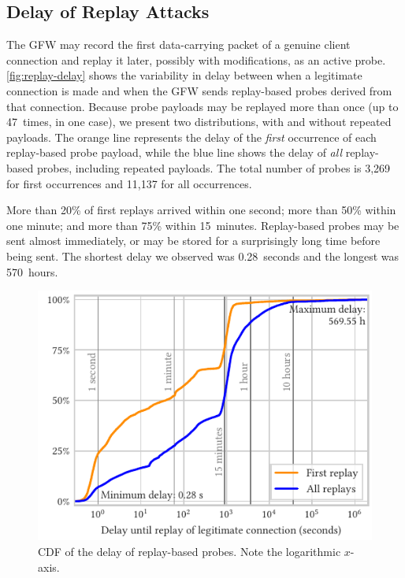 \documentclass[sigconf,letterpaper]{acmart}
\begin{document}

\subsection{Delay of Replay Attacks}
\label{sec:delay-of-replay}

The GFW may record the first data-carrying packet of a genuine client connection
and replay it later, possibly with modifications, as an active probe.
\autoref{fig:replay-delay} shows the variability in delay between
when a legitimate connection is made and when the GFW sends replay-based probes derived from that connection.
Because probe payloads may be replayed more than once
(up to 47~times, in one case),
we present two distributions,
with and without repeated payloads.
The orange line represents the delay of the \emph{first} occurrence
of each replay-based probe payload,
while the blue line shows the delay of \emph{all} replay-based probes,
including repeated payloads.
The total number of probes is 3,269 for first occurrences and 11,137 for all occurrences.

More than 20\% of first replays arrived within one second;
more than 50\% within one minute;
and more than 75\% within 15~minutes.
Replay-based probes may be sent almost immediately, or
may be stored for a surprisingly long time before being sent.
The shortest delay we observed was 0.28~seconds
and the longest was 570~hours.

\begin{figure}
    \includegraphics{figures/delay_of_replays_in_all_experiments.pdf}
    \caption{
    CDF of the delay of replay-based probes.
    Note the logarithmic $x$-axis.
    }
    \label{fig:replay-delay}
\end{figure}
\end{document}
